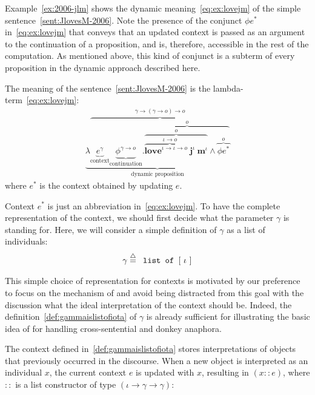 Example~\ref{ex:2006-jlm} shows the dynamic meaning~\eqref{eq:ex:lovejm} of the simple sentence~\eqref{sent:JlovesM-2006}. Note the presence of the conjunct $\phi e^*$ in~\eqref{eq:ex:lovejm} that conveys that an updated context is passed as an argument to the continuation of a proposition, and is, therefore, accessible in the rest of the computation. As mentioned above, this kind of conjunct is a subterm of every proposition in the dynamic approach described here.
 \begin{example} \label{ex:2006-jlm} The meaning of the sentence~\eqref{sent:JlovesM-2006} is the lambda-term~\eqref{eq:ex:lovejm}:
\begin{align}
\underbrace{\lambda \overbrace{\underbrace{e^{\gamma}}_{\text{context}} \underbrace{\phi^{\gamma \rightarrow o}}_{\text{continuation}}.  \overbrace{\overbrace{ \overbrace{\textbf{love}^{\iota \rightarrow \iota \rightarrow o}  \ \textbf{j}^{\iota}}^{\iota \rightarrow o} \ \textbf{m}^{\iota}}^{o} \land \overbrace{\phi e^*}^{o}}^{o}}^{\gamma \rightarrow (\gamma \rightarrow o) \rightarrow o} }_{\text{dynamic proposition}} \label{eq:ex:lovejm}
\end{align}
\indent where  $e^*$ is the context obtained by updating $e$.
\end{example}

 Context $e^*$ is just an abbreviation in~\eqref{eq:ex:lovejm}. To have the complete representation of the context, we should first decide what the parameter $\gamma$ is standing for. Here, we will consider a simple definition of $\gamma$ as a list of individuals:
\begin{align} \label{def:gammaislistofiota}
\gamma \stackrel{{\scriptstyle\triangle}}{=} \texttt{ list of } [ \ \iota \ ]  
\end{align}
 
 This simple choice of representation for contexts is motivated  by our preference to focus on the mechanism of {\FullName} and avoid being distracted from this goal with the discussion what the ideal interpretation of the context should be. Indeed, the definition~\eqref{def:gammaislistofiota} of $\gamma$ is already sufficient for illustrating the basic idea of {\FullName} for handling cross-sentential and donkey anaphora.
 
The context defined in~\eqref{def:gammaislistofiota}  stores interpretations of objects that previously occurred in the discourse. When a new object is interpreted as an individual $x$, the current context $e$ is updated with $x$, resulting in $(x::e)$, where $::$ is a list constructor of type $(\iota \rightarrow \gamma \rightarrow \gamma)$:

